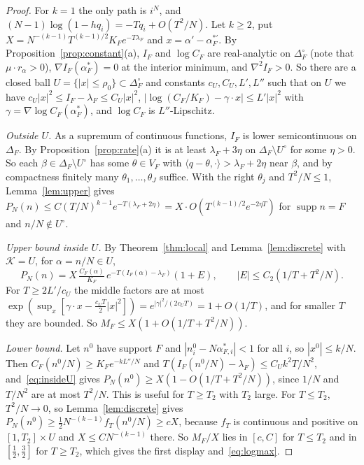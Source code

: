 \begin{proof}
For $k=1$ the only path is $i^N$, and
$(N-1)\log(1-hq_i)=-Tq_i+O(T^2/N)$. Let $k\ge2$, put
$X=N^{-(k-1)}T^{(k-1)/2}K_Fe^{-T\lambda_F}$ and
$x=\alpha'-\alpha^{*\prime}_F$. By Proposition~\ref{prop:constant}(a),
$I_F$ and $\log C_F$ are real-analytic on $\Delta_F^\circ$ (note that
$\mu\cdot r_\alpha>0$), $\nabla I_F(\alpha^*_F)=0$ at the interior minimum,
and $\nabla^2I_F>0$. So there are a closed ball
$U=\{|x|\le\rho_0\}\subset\Delta_F^\circ$ and constants $c_U,C_U,L',L''$ such
that on $U$ we have $c_U|x|^2\le I_F-\lambda_F\le C_U|x|^2$,
$|\log(C_F/K_F)-\gamma\cdot x|\le L'|x|^2$ with
$\gamma=\nabla\log C_F(\alpha^*_F)$, and $\log C_F$ is $L''$-Lipschitz.

\emph{Outside $U$.} As a supremum of continuous functions, $I_F$ is lower
semicontinuous on $\Delta_F$. By Proposition~\ref{prop:rate}(a) it is at least
$\lambda_F+3\eta$ on $\Delta_F\setminus U^\circ$ for some $\eta>0$. So each
$\beta\in\Delta_F\setminus U^\circ$ has some $\theta\in V_F$ with
$\langle q-\theta,\cdot\rangle>\lambda_F+2\eta$ near $\beta$, and by
compactness finitely many $\theta_1,\dots,\theta_J$ suffice. With the right
$\theta_j$ and $T^2/N\le1$, Lemma~\ref{lem:upper} gives
$P_N(n)\le C(T/N)^{k-1}e^{-T(\lambda_F+2\eta)}=X\cdot O(T^{(k-1)/2}e^{-2\eta T})$
for $\operatorname{supp}n=F$ and $n/N\notin U^\circ$.

\emph{Upper bound inside $U$.} By Theorem~\ref{thm:local} and
Lemma~\ref{lem:discrete} with $\mathcal K=U$, for $\alpha=n/N\in U$,
\begin{equation}\label{eq:insideU}
P_N(n)=X\,\tfrac{C_F(\alpha)}{K_F}\,e^{-T(I_F(\alpha)-\lambda_F)}(1+E),
\qquad|E|\le C_2(1/T+T^2/N).
\end{equation}
For $T\ge2L'/c_U$ the middle factors are at most
$\exp(\sup_x[\gamma\cdot x-\frac{c_UT}2|x|^2])=e^{|\gamma|^2/(2c_UT)}=1+O(1/T)$,
and for smaller $T$ they are bounded. So $M_F\le X(1+O(1/T+T^2/N))$.

\emph{Lower bound.} Let $n^0$ have support $F$ and
$|n^0_i-N\alpha^*_{F,i}|<1$ for all $i$, so $|x^0|\le k/N$. Then
$C_F(n^0/N)\ge K_Fe^{-kL''/N}$ and
$T(I_F(n^0/N)-\lambda_F)\le C_Uk^2T/N^2$, and~\eqref{eq:insideU} gives
$P_N(n^0)\ge X(1-O(1/T+T^2/N))$, since $1/N$ and $T/N^2$ are at most
$T^2/N$. This is useful for $T\ge T_2$ with $T_2$ large. For $T\le T_2$,
$T^2/N\to0$, so Lemma~\ref{lem:discrete} gives
$P_N(n^0)\ge\frac12N^{-(k-1)}f_T(n^0/N)\ge cX$, because $f_T$ is continuous
and positive on $[1,T_2]\times U$ and $X\le CN^{-(k-1)}$ there. So $M_F/X$ lies in $[c,C]$ for $T\le T_2$
and in $[\frac12,\frac32]$ for $T\ge T_2$, which gives the first display
and~\eqref{eq:logmax}.


\end{proof}
